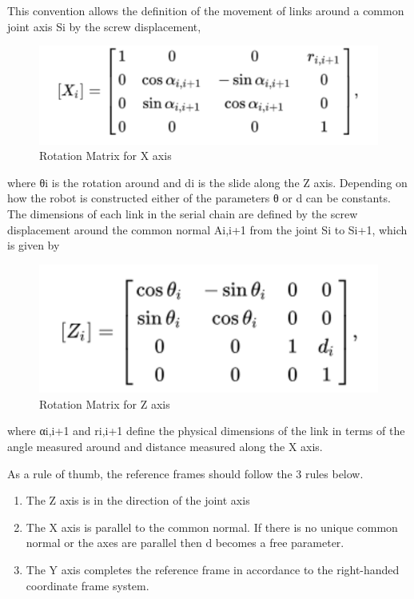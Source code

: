     This convention allows the definition of the movement of links around a common joint axis Si by the screw displacement,
    \begin{figure}[H]
        \centering
        \includegraphics[width=150mm]{xframe.PNG}
        \caption{Rotation Matrix for X axis}
        \label{fig:my_label}
    \end{figure}
    where θi is the rotation around and di is the slide along the Z axis. Depending on how the robot is constructed either of the parameters θ or d can be constants. The dimensions of each link in the serial chain are defined by the screw displacement around the common normal Ai,i+1 from the joint Si to Si+1, which is given by
    \begin{figure}[H]
        \centering
        \includegraphics[width=150mm]{zframe.PNG}
        \caption{Rotation Matrix for Z axis}
        \label{fig:my_label}
    \end{figure}
    where αi,i+1 and ri,i+1 define the physical dimensions of the link in terms of the angle measured around and distance measured along the X axis. 
    
    As a rule of thumb, the reference frames should follow the 3 rules below.
    \begin{enumerate}
        \item The Z axis is in the direction of the joint axis
        \item The X axis is parallel to the common normal. If there is no unique common normal or the axes are parallel then d becomes a free parameter.
        \item The Y axis completes the reference frame in accordance to the right-handed coordinate frame system.
    \end{enumerate}
    
